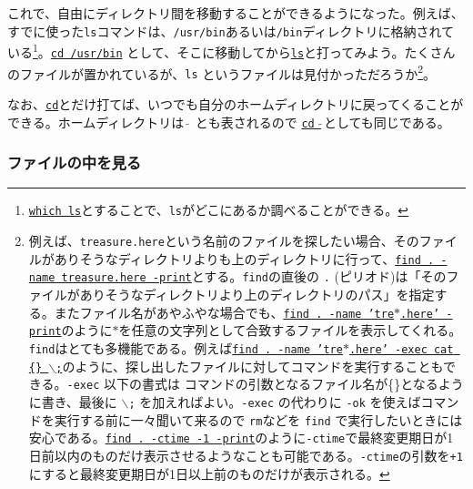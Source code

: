 これで、自由にディレクトリ間を移動することができるようになった。例えば、すでに使った{\tt ls}コマンドは、{\tt /usr/bin}あるいは{\tt /bin}ディレクトリに格納されている\footnote{\underline{\tt which ls}とすることで、{\tt ls}がどこにあるか調べることができる。}。\underline{\tt cd /usr/bin} として、そこに移動してから\underline{\tt ls}と打ってみよう。たくさんのファイルが置かれているが、{\tt ls} というファイルは見付かっただろうか\footnote{例えば、{\tt treasure.here}という名前のファイルを探したい場合、そのファイルがありそうなディレクトリよりも上のディレクトリに行って、\underline{\tt find . -name treasure.here -print}とする。{\tt find}の直後の {\tt .} (ピリオド)は「そのファイルがありそうなディレクトリより上のディレクトリのパス」を指定する。またファイル名があやふやな場合でも、\underline{\tt find . -name 'tre$\ast$.here' -print}のように$\ast$を任意の文字列として合致するファイルを表示してくれる。{\tt find}はとても多機能である。例えば\underline{\tt find . -name 'tre$\ast$.here' -exec cat \{\} $\backslash$;}のように、探し出したファイルに対してコマンドを実行することもできる。{\tt -exec} 以下の書式は コマンドの引数となるファイル名が\{\}となるように書き、最後に {\tt $\backslash$;} を加えればよい。{\tt -exec} の代わりに {\tt -ok} を使えばコマンドを実行する前に一々聞いて来るので {\tt rm}などを {\tt find} で実行したいときには安心である。\underline{\tt find\ .\ -ctime -1 -print}のように{\tt -ctime}で最終変更期日が1日前以内のものだけ表示させるようなことも可能である。{\tt -ctime}の引数を{\tt +1} にすると最終変更期日が1日以上前のものだけが表示される。}。

なお、\underline{{\tt cd}}とだけ打てば、いつでも自分のホームディレクトリに戻ってくることができる。ホームディレクトリは $\tilde{\ }$ とも表されるので \underline{{\tt cd $\tilde{\ }$}}としても同じである。

\subsubsection*{ファイルの中を見る}

